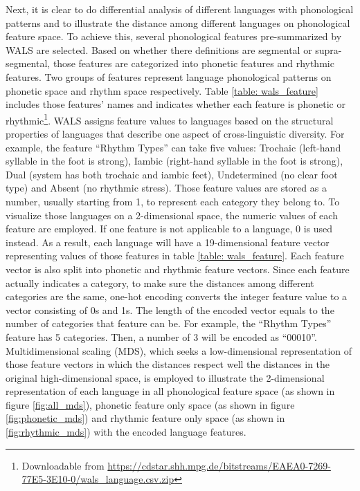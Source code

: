 Next, it is clear to do differential analysis of different languages with phonological patterns and to illustrate the distance among different languages on phonological feature space. To achieve this, several phonological features pre-summarized by WALS are selected. Based on whether there definitions are segmental or supra-segmental, those features are categorized into phonetic features and rhythmic features. Two groups of features represent language phonological patterns on phonetic space and rhythm space respectively. Table \ref{table: wals_feature} includes those features' names and indicates whether each feature is phonetic or rhythmic\footnote{Downloadable from \url{https://cdstar.shh.mpg.de/bitstreams/EAEA0-7269-77E5-3E10-0/wals_language.csv.zip}}. WALS assigns feature values to languages based on the structural properties of languages that describe one aspect of cross-linguistic diversity. For example, the feature ``Rhythm Types'' can take five values: Trochaic (left-hand syllable in the foot is strong), Iambic (right-hand syllable in the foot is strong), Dual (system has both trochaic and iambic feet), Undetermined (no clear foot type) and Absent (no rhythmic stress). Those feature values are stored as a number, usually starting from 1, to represent each category they belong to. To visualize those languages on a 2-dimensional space, the numeric values of each feature are employed. If one feature is not applicable to a language, 0 is used instead. As a result, each language will have a 19-dimensional feature vector representing values of those features in table \ref{table: wals_feature}. Each feature vector is also split into phonetic and rhythmic feature vectors. Since each feature actually indicates a category, to make sure the distances among different categories are the same, one-hot encoding converts the integer feature value to a vector consisting of 0s and 1s. The length of the encoded vector equals to the number of categories that feature can be. For example, the ``Rhythm Types'' feature has 5 categories. Then, a number of 3 will be encoded as ``00010''. Multidimensional scaling (MDS), which seeks a low-dimensional representation of those feature vectors in which the distances respect well the distances in the original high-dimensional space, is employed to illustrate the 2-dimensional representation of each language in all phonological feature space (as shown in figure \ref{fig:all_mds}), phonetic feature only space (as shown in figure \ref{fig:phonetic_mds}) and rhythmic feature only space (as shown in \ref{fig:rhythmic_mds}) with the encoded language features.

